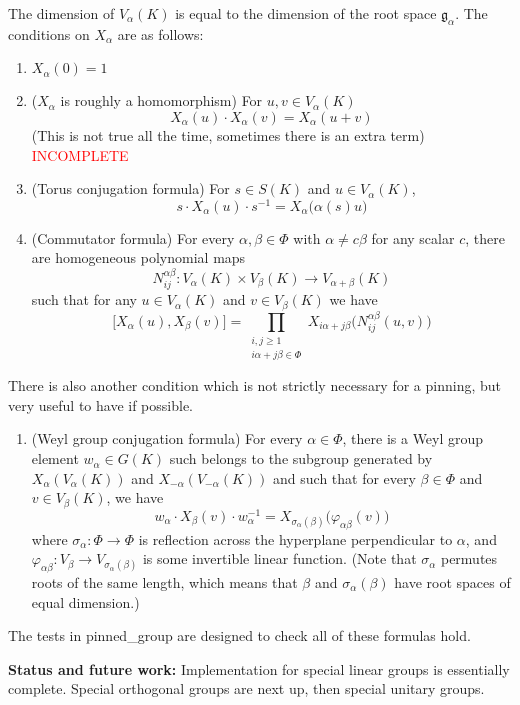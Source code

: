 \documentclass[12pt]{article}
\newcommand{\sig}{\sigma}
\newcommand{\tbf}{\textbf}
\newcommand{\incomplete}{\textcolor{red}{INCOMPLETE}}
\newcommand{\inv}{^{-1}}
\newcommand{\frakg}{\mathfrak{g}}
\begin{document}
\begin{mdframed}[linecolor=red]
The dimension of $V_\alpha(K)$ is equal to the dimension of the root space $\frakg_\alpha$. The conditions on $X_\alpha$ are as follows:
\begin{enumerate}
	\item $X_\alpha(0) = 1$
	\item ($X_\alpha$ is roughly a homomorphism) For $u,v \in V_\alpha(K)$
	\[	
		X_\alpha(u) \cdot X_\alpha(v) = X_\alpha(u+v)
	\]
	(This is not true all the time, sometimes there is an extra term) \incomplete
	\item (Torus conjugation formula) For $s \in S(K)$ and $u \in V_\alpha(K)$,
	\[
		s \cdot X_\alpha(u) \cdot s \inv = X_\alpha \Big( \alpha(s) u \Big)
	\]
	\item (Commutator formula) For every $\alpha, \beta \in \Phi$ with $\alpha \neq c\beta$ for any scalar $c$, there are homogeneous polynomial maps
	\[
		N_{ij}^{\alpha \beta}:V_\alpha(K) \times V_\beta(K) \to V_{\alpha+\beta}(K)
	\]
	such that for any $u \in V_\alpha(K)$ and $v \in V_\beta(K)$ we have
	\[
		\Big[ X_\alpha(u), X_\beta(v) \Big] = \prod_{ \substack{ i, j \ge 1 \\ i \alpha+j\beta \in \Phi}} X_{i \alpha + j\beta} \Big( N_{ij}^{\alpha \beta}(u,v) \Big)
	\]
\end{enumerate}
There is also another condition which is not strictly necessary for a pinning, but very useful to have if possible.
\begin{enumerate}[resume]
	\item (Weyl group conjugation formula) For every $\alpha \in \Phi$, there is a Weyl group element $w_\alpha \in G(K)$ such belongs to the subgroup generated by $X_\alpha(V_\alpha(K))$ and $X_{-\alpha}(V_{-\alpha}(K))$ and such that for every $\beta \in \Phi$ and $v \in V_{\beta}(K)$, we have
	\[
		w_\alpha \cdot X_{\beta}(v) \cdot w_\alpha \inv = X_{\sig_\alpha(\beta)} \Big( \varphi_{\alpha \beta}(v) \Big)
	\]
	where $\sig_\alpha:\Phi \to \Phi$ is reflection across the hyperplane perpendicular to $\alpha$, and $\varphi_{\alpha \beta}:V_{\beta} \to V_{\sig_\alpha(\beta)}$ is some invertible linear function. (Note that $\sig_\alpha$ permutes roots of the same length, which means that $\beta$ and $\sig_\alpha(\beta)$ have root spaces of equal dimension.)
\end{enumerate}

The tests in pinned\_group are designed to check all of these formulas hold.

\smallskip

\tbf{Status and future work:} Implementation for special linear groups is essentially complete. Special orthogonal groups are next up, then special unitary groups.
\end{mdframed}
\end{document}

